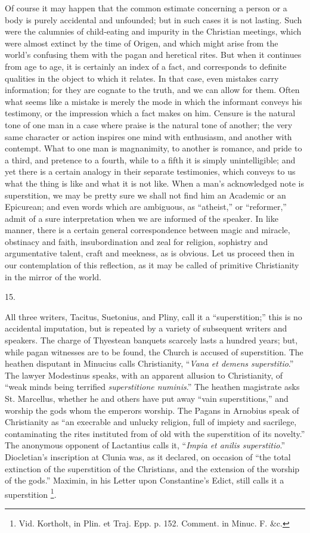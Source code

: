 Of course it may happen that the common estimate
concerning a person or a body is purely accidental and unfounded; but in such cases it is not lasting. Such were
the calumnies of child-eating and impurity in the
Christian meetings, which were almost extinct by the time
of Origen, and which might arise from the world's
confusing them with the pagan and heretical rites. But
when it continues from age to age, it is certainly an
index of a fact, and corresponds to definite qualities in
the object to which it relates. In that case, even
mistakes carry information; for they are cognate to the
truth, and we can allow for them. Often what seems like a
mistake is merely the mode in which the informant conveys
his testimony, or the impression which a fact makes on
him. Censure is the natural tone of one man in a case
where praise is the natural tone of another; the very
same character or action inspires one mind with
enthusiasm, and another with contempt. What to one man is
magnanimity, to another is romance, and pride to a third,
and pretence to a fourth, while to a fifth it is simply
unintelligible; and yet there is a certain analogy in
their separate testimonies, which conveys to us what the
thing is like and what it is not like. When a man's
acknowledged note is superstition, we may be pretty sure
we shall not find him an Academic or an Epicurean; and
even words which are ambiguous, as ``atheist,''
or ``reformer,'' admit of a sure interpretation
when we are informed of the speaker. In like manner,
there is a certain general correspondence between magic
and miracle, obstinacy and faith, insubordination and
zeal for religion, sophistry and argumentative talent,
craft and meekness, as is obvious. Let us proceed then in
our contemplation of this reflection, as it may be called
of primitive Christianity in the mirror of the world.

15.

All three writers, Tacitus, Suetonius, and Pliny, call
it a ``superstition;'' this is no accidental
imputation, but is repeated by a variety of subsequent
writers and speakers. The charge of Thyestean banquets
scarcely lasts a hundred years; but, while pagan
witnesses are to be found, the Church is accused of
superstition. The heathen disputant in Minucius calls
Christianity, ``\emph{Vana et demens superstitio}.''
The lawyer Modestinus speaks, with an apparent allusion
to Christianity, of ``weak minds being terrified \emph{superstitione
numinis}.'' The heathen magistrate asks St.
Marcellus, whether he and others have put away ``vain
superstitions,'' and worship the gods whom the
emperors worship. The Pagans in Arnobius speak of
Christianity as ``an execrable and unlucky religion,
full of impiety and sacrilege, contaminating the rites
instituted from of old with the superstition of its
novelty.'' The anonymous opponent of Lactantius calls
it, ``\emph{Impia et anilis superstitio}.''
Diocletian's inscription at Clunia was, as it declared,
on occasion of ``the total extinction of the
superstition of the Christians, and the extension of the
worship of the gods.'' Maximin, in his Letter upon
Constantine's Edict, still calls it a superstition \footnote{Vid. Kortholt, in Plin. et
Traj. Epp. p. 152. Comment. in Minuc. F. \&c.}.

